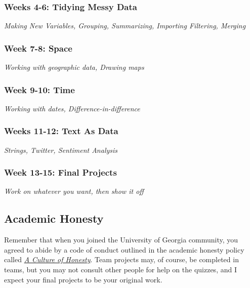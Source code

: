 \documentclass[11pt, letterpaper]{article}
\begin{document}
\subsubsection*{Weeks 4-6: Tidying Messy Data}
\textit{Making New Variables, Grouping, Summarizing, Importing Filtering, Merging}

\subsubsection*{Week 7-8: Space}
\textit{Working with geographic data, Drawing maps}

\subsubsection*{Week 9-10: Time}
\textit{Working with dates, Difference-in-difference}

\subsubsection*{Weeks 11-12: Text As Data}
\textit{Strings, Twitter, Sentiment Analysis}

\subsubsection*{Week 13-15: Final Projects}
\textit{Work on whatever you want, then show it off}






\subsection*{Academic Honesty}
Remember that when you joined the University of Georgia community, you agreed to abide by a code of conduct outlined in the academic honesty policy called \href{https://honesty.uga.edu/Academic-Honesty-Policy/Introduction/}{\textit{A Culture of Honesty}}. Team projects may, of course, be completed in teams, but you may not consult other people for help on the quizzes, and I expect your final projects to be your original work.
\end{document}
